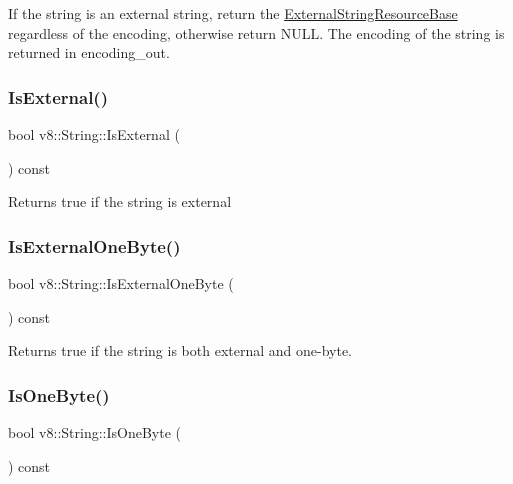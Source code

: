 If the string is an external string, return the \mbox{\hyperlink{classv8_1_1String_1_1ExternalStringResourceBase}{External\+String\+Resource\+Base}} regardless of the encoding, otherwise return N\+U\+LL. The encoding of the string is returned in encoding\+\_\+out. \mbox{\label{classv8_1_1String_a1d24faa97c6168221ec362c395d41ce1}} 
\subsubsection{\texorpdfstring{Is\+External()}{IsExternal()}}
{\footnotesize\ttfamily bool v8\+::\+String\+::\+Is\+External (\begin{DoxyParamCaption}{ }\end{DoxyParamCaption}) const}

Returns true if the string is external \mbox{\label{classv8_1_1String_a29b5d1786d906b84e10a5cab9451f976}} 
\subsubsection{\texorpdfstring{Is\+External\+One\+Byte()}{IsExternalOneByte()}}
{\footnotesize\ttfamily bool v8\+::\+String\+::\+Is\+External\+One\+Byte (\begin{DoxyParamCaption}{ }\end{DoxyParamCaption}) const}

Returns true if the string is both external and one-\/byte. \mbox{\label{classv8_1_1String_a8f14ab3aff52295d2d3245081a1b29eb}} 
\subsubsection{\texorpdfstring{Is\+One\+Byte()}{IsOneByte()}}
{\footnotesize\ttfamily bool v8\+::\+String\+::\+Is\+One\+Byte (\begin{DoxyParamCaption}{ }\end{DoxyParamCaption}) const}

